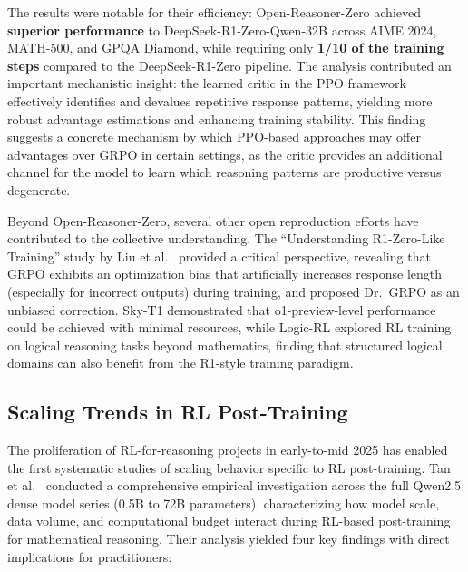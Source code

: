 The results were notable for their efficiency: Open-Reasoner-Zero achieved \textbf{superior performance} to DeepSeek-R1-Zero-Qwen-32B across AIME 2024, MATH-500, and GPQA Diamond, while requiring only \textbf{1/10 of the training steps} compared to the DeepSeek-R1-Zero pipeline. The analysis contributed an important mechanistic insight: the learned critic in the PPO framework effectively identifies and devalues repetitive response patterns, yielding more robust advantage estimations and enhancing training stability. This finding suggests a concrete mechanism by which PPO-based approaches may offer advantages over GRPO in certain settings, as the critic provides an additional channel for the model to learn which reasoning patterns are productive versus degenerate.

Beyond Open-Reasoner-Zero, several other open reproduction efforts have contributed to the collective understanding. The ``Understanding R1-Zero-Like Training'' study by Liu et al.~\cite{liu2025understanding} provided a critical perspective, revealing that GRPO exhibits an optimization bias that artificially increases response length (especially for incorrect outputs) during training, and proposed Dr.\ GRPO as an unbiased correction. Sky-T1 demonstrated that o1-preview-level performance could be achieved with minimal resources, while Logic-RL explored RL training on logical reasoning tasks beyond mathematics, finding that structured logical domains can also benefit from the R1-style training paradigm.

\subsection*{Scaling Trends in RL Post-Training}

The proliferation of RL-for-reasoning projects in early-to-mid 2025 has enabled the first systematic studies of scaling behavior specific to RL post-training. Tan et al.~\cite{tan2025scaling} conducted a comprehensive empirical investigation across the full Qwen2.5 dense model series (0.5B to 72B parameters), characterizing how model scale, data volume, and computational budget interact during RL-based post-training for mathematical reasoning. Their analysis yielded four key findings with direct implications for practitioners:


